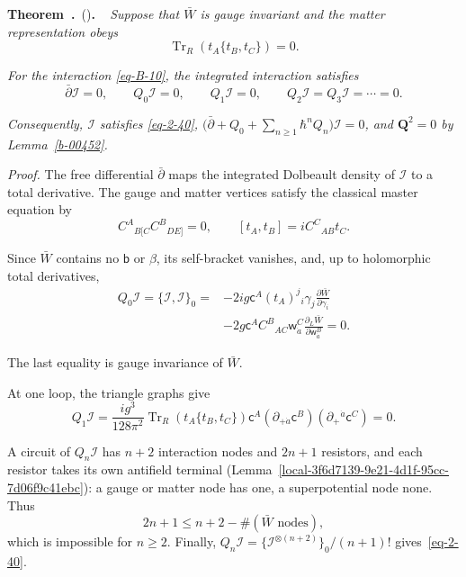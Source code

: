 \documentclass[11pt]{article}
\numberwithin{equation}{section}
\numberwithin{figure}{section}
\numberwithin{table}{section}
\newcounter{rthmc}[section]
\renewcommand{\therthmc}{\thesection.\arabic{rthmc}}
\newcommand{\rthm}[3]{\par\addvspace{\medskipamount}\noindent\refstepcounter{rthmc}\label{#2}\textbf{#1~\therthmc}\if\relax\detokenize{#3}\relax\else\ (#3)\fi\textbf{.}}
\begin{document}
\rthm{Theorem}{b-00465}{} ~ \emph{Suppose that $\bar W$ is gauge invariant and the matter representation obeys}
\begin{equation}\label{eq-2-41}
\operatorname{Tr}_R\!\left(t_A\{t_B,t_C\}\right)=0.
\end{equation}

\emph{For the interaction \eqref{eq-B-10}, the integrated interaction satisfies}
\begin{equation}\label{b-00468}
\bar\partial\mathcal I=0,\qquad
Q_0\mathcal I=0,\qquad Q_1\mathcal I=0,\qquad
Q_2\mathcal I=Q_3\mathcal I=\cdots=0.
\end{equation}

\emph{Consequently, $\mathcal I$ satisfies \eqref{eq-2-40}, $\bigl(\bar\partial+Q_0+\sum_{n\ge1}\hbar^nQ_n\bigr)\mathcal I=0$, and $\mathbf Q^2=0$ by Lemma~\ref{b-00452}.}

\emph{Proof.} The free differential $\bar\partial$ maps the integrated Dolbeault density of $\mathcal I$ to a total derivative. The gauge and matter vertices satisfy the classical master equation by
\begin{equation*}
C^A{}_{B[C}C^B{}_{DE]}=0,
\qquad [t_A,t_B]=iC^C{}_{AB}t_C.
\end{equation*}

Since $\bar W$ contains no $\mathsf b$ or $\beta$, its self-bracket vanishes, and, up to holomorphic total derivatives,
\begin{equation*}
\begin{aligned}
Q_0\mathcal I=\{\mathcal I,\mathcal I\}_0
={}&-2ig\mathsf c^A(t_A)^j{}_i\gamma_j
\frac{\partial\bar W}{\partial\gamma_i}\\
&-2g\mathsf c^AC^B{}_{AC}\mathsf w^C_{\dot a}
\frac{\partial_L\bar W}{\partial\mathsf w^B_{\dot a}}=0.
\end{aligned}
\end{equation*}

The last equality is gauge invariance of $\bar W$.

At one loop, the triangle graphs give
\begin{equation}\label{b-00478}
Q_1\mathcal I
=\frac{ig^3}{128\pi^2}
\operatorname{Tr}_R\!\left(t_A\{t_B,t_C\}\right)
\mathsf c^A(\partial_{+\dot a}\mathsf c^B)
(\partial_+{}^{\dot a}\mathsf c^C)=0.
\end{equation}

A circuit of $Q_n\mathcal I$ has $n+2$ interaction nodes and $2n+1$ resistors, and each resistor takes its own antifield terminal (Lemma~\ref{local-3f6d7139-9e21-4d1f-95cc-7d06f9c41ebc}): a gauge or matter node has one, a superpotential node none. Thus
\begin{equation*}
2n+1\le n+2-\#(\bar W\text{ nodes}),
\end{equation*}
which is impossible for $n\ge2$. Finally, $Q_n\mathcal I=\{\mathcal I^{\otimes(n+2)}\}_0/(n+1)!$ gives~\eqref{eq-2-40}.~\hfill\qedsymbol
\end{document}
